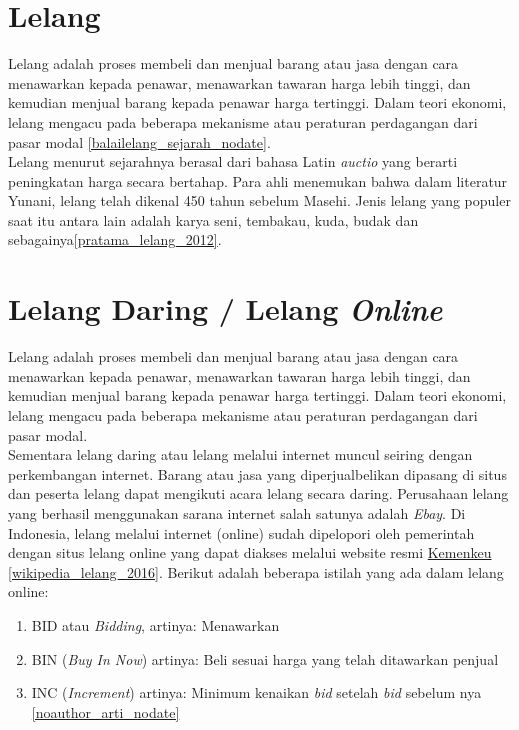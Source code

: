 	\section{Lelang}
	Lelang adalah proses membeli dan menjual barang atau jasa dengan cara menawarkan kepada penawar, menawarkan tawaran harga lebih tinggi, dan kemudian menjual barang kepada penawar harga tertinggi. Dalam teori ekonomi, lelang mengacu pada beberapa mekanisme atau peraturan perdagangan dari pasar modal \ref{balailelang_sejarah_nodate}.
	\\ \indent
	Lelang menurut sejarahnya berasal dari bahasa Latin \textit{auctio} yang berarti peningkatan harga secara bertahap. Para ahli menemukan bahwa dalam literatur Yunani, lelang telah dikenal 450 tahun sebelum Masehi. Jenis lelang yang populer saat itu antara lain adalah karya seni, tembakau, kuda, budak dan sebagainya\ref{pratama_lelang_2012}.
	   
	\section{Lelang Daring / Lelang \textit{Online}}
	Lelang adalah proses membeli dan menjual barang atau jasa dengan cara menawarkan kepada penawar, menawarkan tawaran harga lebih tinggi, dan kemudian menjual barang kepada penawar harga tertinggi. Dalam teori ekonomi, lelang mengacu pada beberapa mekanisme atau peraturan perdagangan dari pasar modal. \\
	Sementara lelang daring atau lelang melalui internet muncul seiring dengan perkembangan internet. Barang atau jasa yang diperjualbelikan dipasang di situs dan peserta lelang dapat mengikuti acara lelang secara daring. Perusahaan lelang yang berhasil menggunakan sarana internet salah satunya adalah \textit{Ebay}. Di Indonesia, lelang melalui internet (online) sudah dipelopori oleh pemerintah dengan situs lelang online yang dapat diakses melalui website resmi \href{https://www.lelangdjkn.kemenkeu.go.id}{Kemenkeu} \ref{wikipedia_lelang_2016}. 
	Berikut adalah beberapa istilah yang ada dalam lelang online:
	\begin{enumerate}
	      	\item BID atau \textit{Bidding}, artinya: Menawarkan
	      	\item BIN (\textit{Buy In Now}) artinya: Beli sesuai harga yang telah ditawarkan penjual
	      	\item INC (\textit{Increment}) artinya: Minimum kenaikan \textit{bid} setelah \textit{bid} sebelum nya \ref{noauthor_arti_nodate}
	\end{enumerate}


